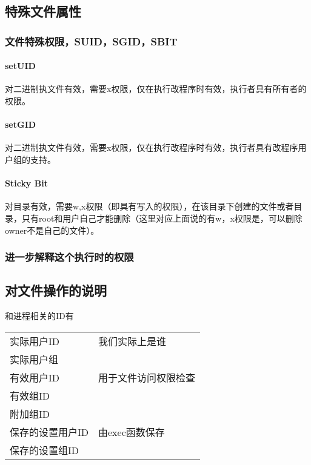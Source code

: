 
\subsection{特殊文件属性}


\subsubsection{文件特殊权限，SUID，SGID，SBIT}

\paragraph{setUID}

对二进制执文件有效，需要x权限，仅在执行改程序时有效，执行者具有所有者的权限。

\paragraph{setGID}

对二进制执文件有效，需要x权限，仅在执行改程序时有效，执行者具有改程序用户组的支持。

\paragraph{Sticky Bit}

对目录有效，需要w,x权限（即具有写入的权限），在该目录下创建的文件或者目录，只有root和用户自己才能删除（这里对应上面说的有w，x权限是，可以删除owner不是自己的文件）。


\subsubsection{进一步解释这个执行时的权限}

\subsection{对文件操作的说明}

和进程相关的ID有

\begin{table}
\begin{tabular}{|l|l|}
\hline
实际用户ID & 我们实际上是谁\\
实际用户组 & \\
\hline
有效用户ID & 用于文件访问权限检查\\
有效组ID & \\
附加组ID & \\
\hline
保存的设置用户ID & 由exec函数保存\\
保存的设置组ID & \\
\hline
\end{tabular}
\end{table}


